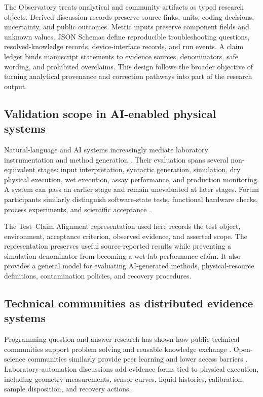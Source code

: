 The Observatory treats analytical and community artifacts as typed research objects. Derived discussion records preserve source links, units, coding decisions, uncertainty, and public outcomes. Metric inputs preserve component fields and unknown values. JSON Schemas define reproducible troubleshooting questions, resolved-knowledge records, device-interface records, and run events. A claim ledger binds manuscript statements to evidence sources, denominators, safe wording, and prohibited overclaims. This design follows the broader objective of turning analytical provenance and correction pathways into part of the research output.

\subsection{Validation scope in AI-enabled physical systems}

Natural-language and AI systems increasingly mediate laboratory instrumentation and method generation \cite{xie2025llmcontrol}. Their evaluation spans several non-equivalent stages: input interpretation, syntactic generation, simulation, dry physical execution, wet execution, assay performance, and production monitoring. A system can pass an earlier stage and remain unevaluated at later stages. Forum participants similarly distinguish software-state tests, functional hardware checks, process experiments, and scientific acceptance \cite{forum_unit_tests,forum_verisflow}.

The Test--Claim Alignment representation used here records the test object, environment, acceptance criterion, observed evidence, and asserted scope. The representation preserves useful source-reported results while preventing a simulation denominator from becoming a wet-lab performance claim. It also provides a general model for evaluating AI-generated methods, physical-resource definitions, contamination policies, and recovery procedures.

\subsection{Technical communities as distributed evidence systems}

Programming question-and-answer research has shown how public technical communities support problem solving and reusable knowledge exchange \cite{treude2011questions,vasilescu2014social}. Open-science communities similarly provide peer learning and lower access barriers \cite{eerland2021communities}. Laboratory-automation discussions add evidence forms tied to physical execution, including geometry measurements, sensor curves, liquid histories, calibration, sample disposition, and recovery actions.

